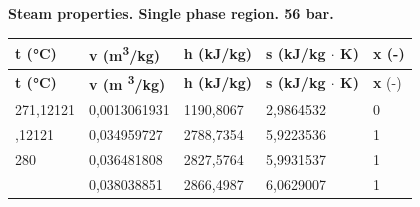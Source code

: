 \documentclass[a4paper]{article}
\begin{document}
\begin{center}
    \textbf{ Steam properties. Single phase region. 56 bar. }
\end{center}
\vspace{0.2cm} %

\begin{longtable}{|>{\raggedleft\arraybackslash}p{3cm}|>{\raggedleft\arraybackslash}p{3cm}|>{\raggedleft\arraybackslash}p{3cm}|>{\raggedleft\arraybackslash}p{3cm}|>{\raggedleft\arraybackslash}p{2cm}|}
\hline
\textbf{t (°C)} & \textbf{v (m\textsuperscript{3}/kg)} & \textbf{h (kJ/kg)} & \textbf{s (kJ/kg $\cdot$ K)} & \textbf{x} (-) \\
\hline
\endfirsthead

\hline
\textbf{t (°C)} & \textbf{v (m \textsuperscript{3}/kg)} & \textbf{h (kJ/kg)} & \textbf{s (kJ/kg $\cdot$ K)} & \textbf{x} (-) \\
\hline
\endhead

\hline
\endfoot

\hline
\endlastfoot



271,12121 & 

0,0013061931 & 

1190,8067 & 

2,9864532 & 

0
 \\


271,12121 & 

0,034959727 & 

2788,7354 & 

5,9223536 & 

1
 \\
 \hline  %


280 & 

0,036481808 & 

2827,5764 & 

5,9931537 & 

1
 \\


290 & 

0,038038851 & 

2866,4987 & 

6,0629007 & 

1
 \\



\end{longtable}
\end{document}
